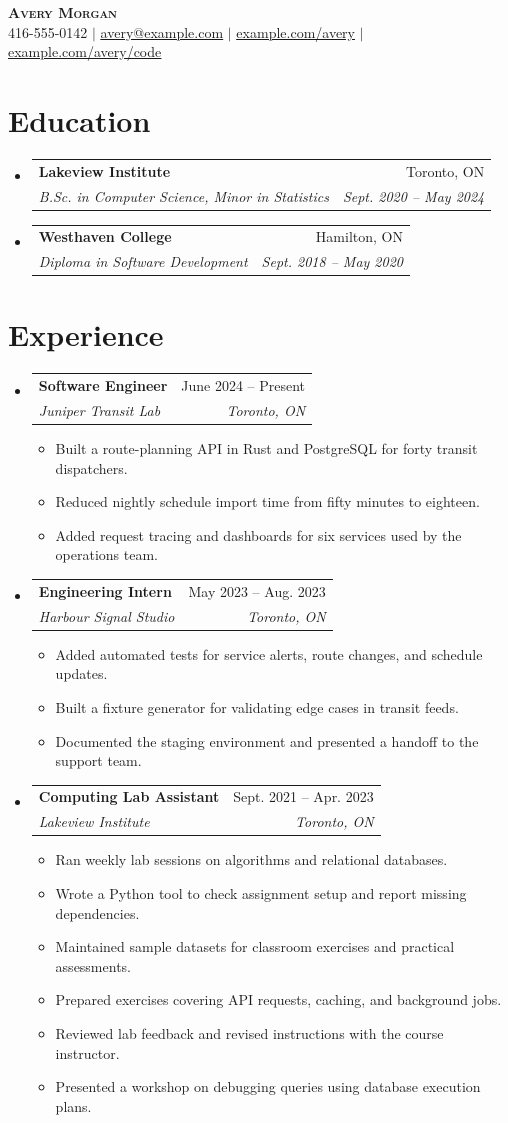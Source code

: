 \documentclass[letterpaper,11pt]{article}
\makeatletter
\newcommand{\resumeItem}[1]{
  \item\small{
    {#1 \vspace{-2pt}}
  }
}
\newcommand{\resumeSubheading}[4]{
  \vspace{-2pt}\item
    \begin{tabular*}{0.97\textwidth}[t]{l@{\extracolsep{\fill}}r}
      \textbf{#1} & #2 \\
      \textit{\small#3} & \textit{\small #4} \\
    \end{tabular*}\vspace{-7pt}
}
\newcommand{\resumeSubHeadingListStart}{\begin{itemize}[leftmargin=0.15in, label={}]}
\newcommand{\resumeSubHeadingListEnd}{\end{itemize}}
\newcommand{\resumeItemListStart}{\begin{itemize}}
\newcommand{\resumeItemListEnd}{\end{itemize}\vspace{-5pt}}
\makeatother
\begin{document}
\begin{center}
  \textbf{\Huge\scshape Avery Morgan} \\[1pt]
  \small 416-555-0142 $|$
  \href{mailto:avery@example.com}{\underline{avery@example.com}} $|$
  \href{https://example.com/avery}{\underline{example.com/avery}} $|$
  \href{https://example.com/avery/code}{\underline{example.com/avery/code}}
\end{center}

\section{Education}
\resumeSubHeadingListStart
  \resumeSubheading
    {Lakeview Institute}{Toronto, ON}
    {B.Sc. in Computer Science, Minor in Statistics}{Sept. 2020 -- May 2024}
  \resumeSubheading
    {Westhaven College}{Hamilton, ON}
    {Diploma in Software Development}{Sept. 2018 -- May 2020}
\resumeSubHeadingListEnd

\section{Experience}
\resumeSubHeadingListStart
  \resumeSubheading
    {Software Engineer}{June 2024 -- Present}
    {Juniper Transit Lab}{Toronto, ON}
  \resumeItemListStart
    \resumeItem{Built a route-planning API in Rust and PostgreSQL for forty transit dispatchers.}
    \resumeItem{Reduced nightly schedule import time from fifty minutes to eighteen.}
    \resumeItem{Added request tracing and dashboards for six services used by the operations team.}
  \resumeItemListEnd

  \resumeSubheading
    {Engineering Intern}{May 2023 -- Aug. 2023}
    {Harbour Signal Studio}{Toronto, ON}
  \resumeItemListStart
    \resumeItem{Added automated tests for service alerts, route changes, and schedule updates.}
    \resumeItem{Built a fixture generator for validating edge cases in transit feeds.}
    \resumeItem{Documented the staging environment and presented a handoff to the support team.}
  \resumeItemListEnd

  \resumeSubheading
    {Computing Lab Assistant}{Sept. 2021 -- Apr. 2023}
    {Lakeview Institute}{Toronto, ON}
  \resumeItemListStart
    \resumeItem{Ran weekly lab sessions on algorithms and relational databases.}
    \resumeItem{Wrote a Python tool to check assignment setup and report missing dependencies.}
    \resumeItem{Maintained sample datasets for classroom exercises and practical assessments.}
    \resumeItem{Prepared exercises covering API requests, caching, and background jobs.}
    \resumeItem{Reviewed lab feedback and revised instructions with the course instructor.}
    \resumeItem{Presented a workshop on debugging queries using database execution plans.}
  \resumeItemListEnd
\resumeSubHeadingListEnd
\end{document}
